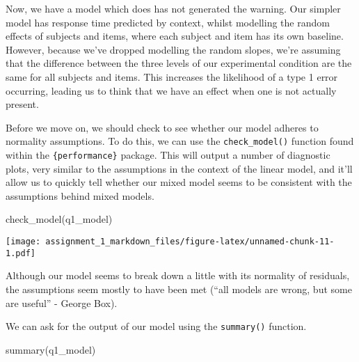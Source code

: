 \documentclass[
]{article}
\newenvironment{Shaded}{\begin{snugshade}}{\end{snugshade}}
\newcommand{\FunctionTok}[1]{\textcolor[rgb]{0.00,0.00,0.00}{#1}}
\newcommand{\NormalTok}[1]{#1}
\begin{document}
Now, we have a model which does has not generated the warning. Our
simpler model has response time predicted by context, whilst modelling
the random effects of subjects and items, where each subject and item
has its own baseline. However, because we've dropped modelling the
random slopes, we're assuming that the difference between the three
levels of our experimental condition are the same for all subjects and
items. This increases the likelihood of a type 1 error occurring,
leading us to think that we have an effect when one is not actually
present.

Before we move on, we should check to see whether our model adheres to
normality assumptions. To do this, we can use the
\texttt{check\_model()} function found within the
\texttt{\{performance\}} package. This will output a number of
diagnostic plots, very similar to the assumptions in the context of the
linear model, and it'll allow us to quickly tell whether our mixed model
seems to be consistent with the assumptions behind mixed models.

\begin{Shaded}
\begin{Highlighting}[]
\FunctionTok{check\_model}\NormalTok{(q1\_model)}
\end{Highlighting}
\end{Shaded}

\texttt{[image: assignment\_1\_markdown\_files/figure-latex/unnamed-chunk-11-1.pdf]}

Although our model seems to break down a little with its normality of
residuals, the assumptions seem mostly to have been met (``all models
are wrong, but some are useful'' - George Box).

We can ask for the output of our model using the \texttt{summary()}
function.

\begin{Shaded}
\begin{Highlighting}[]
\FunctionTok{summary}\NormalTok{(q1\_model)}
\end{Highlighting}
\end{Shaded}
\end{document}
